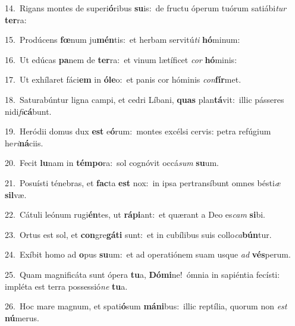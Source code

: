 {\numbfont\textcolor{\numbcolor}{14.}}~Rigans montes de superi\-\textbf{ó}\-ribus \textbf{su}\-is:~\star de fructu óperum tuórum satiábi\textit{tur} \textbf{ter}\-ra:\par
{\numbfont\textcolor{\numbcolor}{15.}}~Prodúcens \textbf{fœ}\-num ju\-\textbf{mén}\-tis:~\star et herbam servitú\textit{ti} \textbf{hó}\-minum:\par
{\numbfont\textcolor{\numbcolor}{16.}}~Ut edúcas \textbf{pa}\-nem de \textbf{ter}\-ra:~\star et vinum lætíficet \textit{cor} \textbf{hó}\-minis:\par
{\numbfont\textcolor{\numbcolor}{17.}}~Ut exhílaret fáci\textbf{em} in \textbf{ó}\-\textbf{le}o:~\star et panis cor hóminis \textit{con}\-\textbf{fír}met.\par
{\numbfont\textcolor{\numbcolor}{18.}}~Saturabúntur ligna campi, et cedri Líbani, \textbf{quas} plan\-\textbf{tá}\-vit:~\star illic pásseres nidi\-\textit{fi}\-\textbf{cá}bunt.\par
{\numbfont\textcolor{\numbcolor}{19.}}~Heródii domus dux \textbf{est} e\-\textbf{ó}\-rum:~\star montes excélsi cervis: petra refúgium he\-\textit{ri}\-\textbf{ná}ciis.\par
{\numbfont\textcolor{\numbcolor}{20.}}~Fecit \textbf{lu}\-nam in \textbf{tém}\-\textbf{po}ra:~\star sol cognóvit occá\textit{sum} \textbf{su}\-um.\par
{\numbfont\textcolor{\numbcolor}{21.}}~Posuísti ténebras, et \textbf{fac}\-ta \textbf{est} nox:~\star in ipsa pertransíbunt omnes bésti\textit{æ} \textbf{sil}\-væ.\par
{\numbfont\textcolor{\numbcolor}{22.}}~Cátuli leónum rugi\-\textbf{én}\-tes, ut \textbf{rá}\-\textbf{pi}ant:~\star et quærant a Deo es\textit{cam} \textbf{si}\-bi.\par
{\numbfont\textcolor{\numbcolor}{23.}}~Ortus est sol, et \textbf{con}\-gre\-\textbf{gá}\-\textbf{ti} sunt:~\star et in cubílibus suis collo\-\textit{ca}\-\textbf{bún}tur.\par
{\numbfont\textcolor{\numbcolor}{24.}}~Exíbit homo ad \textbf{o}\-pus \textbf{su}\-um:~\star et ad operatiónem suam usque \textit{ad} \textbf{vés}\-perum.\par
{\numbfont\textcolor{\numbcolor}{25.}}~Quam magnificáta sunt ópera \textbf{tu}\-a, \textbf{Dó}\-\textbf{mi}ne!~\star ómnia in sapiéntia fecísti: impléta est terra possessió\textit{ne} \textbf{tu}\-a.\par
{\numbfont\textcolor{\numbcolor}{26.}}~Hoc mare magnum, et spati\-\textbf{ó}\-sum \textbf{má}\-\textbf{ni}bus:~\star illic reptília, quorum non \textit{est} \textbf{nú}\-merus.\par
